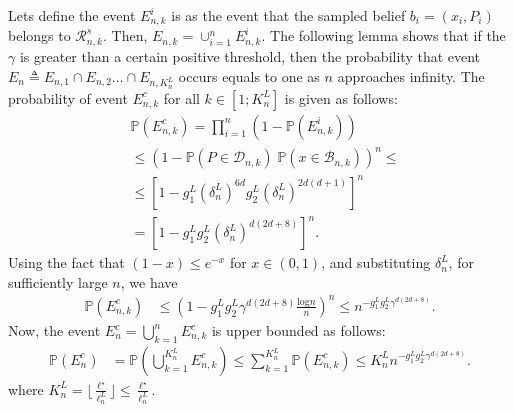 \documentclass[Afour,sageh,times]{sagej}
\begin{document}
Lets define the event $E^i_{n,k}$ is as the event that the sampled belief $b_i=(x_i,P_i)$ belongs to $\mathcal{R}^s_{n,k}$. Then, $E_{n,k}= \cup_{i=1}^n E^i_{n,k}$. The following lemma shows that if the $\gamma$ is greater than a certain positive threshold, then the probability that event $E_n\triangleq E_{n,1}\cap E_{n,2}\dots \cap E_{n,K^L_n}$ occurs equals to one as $n$ approaches infinity.
The probability of event $E^c_{n,k}$ for all $k\in[1;K^L_n]$ is given as follows:
\begin{align}
   &\mathbb{P}\left(E^c_{n,k}\right)
   = \prod_{i=1}^{n}(1-\mathbb{P}\left(E^i_{n,k}\right))\nonumber\\
   &\leq \left(1- \mathbb{P}(P\in\mathcal{D}_{n,k}) \;     \mathbb{P}(x\in\mathcal{B}_{n,k})\right)^n\leq \nonumber\\ \nonumber
   &\leq\left[1- g^L_1 (\delta^L_n)^{6d} g^L_2 (\delta^L_n)^{2d(d+1)} \right]^n \nonumber\\
   &= \left[1- g^L_1 g^L_2 (\delta^L_n)^{d(2d+8)} \right]^n.\nonumber
    \end{align}
Using the fact that $(1-x)\leq e^{-x}$ for $x\in(0,1)$, and substituting $\delta^L_n$, for sufficiently large $n$, we have
\begin{align} \nonumber
 \mathbb{P}\left(E^c_{n,k}\right)&\leq \left(1-g^L_1 g^L_2
 {\gamma^{d(2d+8)}\frac{\text{log}n}{n}} \right)^{n} \leq
  n^{- g^L_1 g^L_2 \gamma^{d(2d+8)}}.\nonumber
\end{align}
Now, the event $E_n^c=\bigcup_{k=1}^n E^c_{n,k}$ is upper bounded as follows:
\begin{align}
  \mathbb{P}\left(E^c_{n}\right)& \!=\!\mathbb{P}\left(\bigcup_{k=1}^{K^L_n} E^c_{n,k}\right) 
 \! \leq \! \sum_{k=1}^{K^L_n}\mathbb{P}\left( E^c_{n,k}\right)\!\leq \! K^L_n n^{- g^L_1 g^L_2 \gamma^{d(2d+8)}}.  \nonumber
\end{align}
where $K^L_n=\lfloor\frac{\ell^\star}{\ell^L_n}\rfloor\leq\frac{\ell^\star}{\ell^L_n}$.
\end{document}

